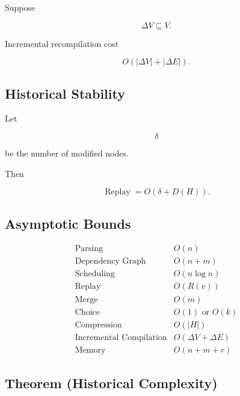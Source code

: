 \documentclass[12pt,oneside]{article}
\theoremstyle{definition}
\theoremstyle{remark}
\begin{document}
Suppose

\[
\Delta V
\subseteq
V.
\]

Incremental recompilation cost

\[
O
(
|\Delta V|
+
|\Delta E|
).
\]

\subsection*{Historical Stability}

Let

\[
\delta
\]

be the number of modified nodes.

Then

\[
\operatorname{Replay}
=
O(\delta+D(H)).
\]

\subsection*{Asymptotic Bounds}

\[
\begin{array}{lcl}
\text{Parsing}
&
O(n)
\\[0.4em]

\text{Dependency Graph}
&
O(n+m)
\\[0.4em]

\text{Scheduling}
&
O(n\log n)
\\[0.4em]

\text{Replay}
&
O(R(v))
\\[0.4em]

\text{Merge}
&
O(m)
\\[0.4em]

\text{Choice}
&
O(1)
\text{ or }
O(k)
\\[0.4em]

\text{Compression}
&
O(|H|)
\\[0.4em]

\text{Incremental Compilation}
&
O(\Delta V+\Delta E)
\\[0.4em]

\text{Memory}
&
O(n+m+r)
\end{array}
\]

\subsection*{Theorem (Historical Complexity)}
\end{document}
